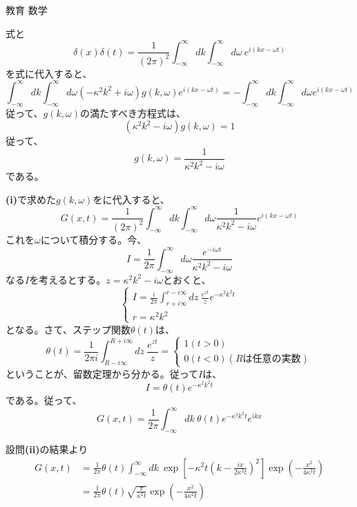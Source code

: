 \documentclass[fleqn]{jbook}
\begin{document}
\begin{answer}{教育 数学}{}
\begin{subanswers}
\begin{subsubanswers}
      
\end{subsubanswers}

\SubAnswer
\begin{subsubanswers}
      \SubSubAnswer
      式と
      \[
      \delta (x)\delta (t) = \frac{1}{(2 \pi)^2}\int^{\infty}_{-\infty}dk\int^{\infty}_{-\infty}d\omega \ e^{i(kx-\omega t)}
      \]
      を式に代入すると、
      \[
      \int^{\infty}_{-\infty}dk\int^{\infty}_{-\infty}d\omega (-\kappa^2 k^2 + i\omega) g(k,\omega)e^{i(kx-\omega t)} = - \int^{\infty}_{-\infty}dk\int^{\infty}_{-\infty}d\omega e^{i(kx-\omega t)}
      \]
      従って、$g(k,\omega)$の満たすべき方程式は、
      \[
      (\kappa^2 k^2 - i\omega) g(k,\omega) = 1
      \]
      従って、
      \[
       g(k,\omega) = \frac{1}{\kappa^2 k^2 - i\omega}
      \]
      である。
      
      
\SubSubAnswer
      
      \textbf{(i)}で求めた$g(k,\omega)$をに代入すると、
      \[
      G(x,t) = \frac{1}{(2 \pi)^2}\int^{\infty}_{-\infty}dk\int^{\infty}_{-\infty}d\omega \frac{1}{\kappa^2 k^2 - i\omega} e^{i(kx-\omega t)}
      \]
      これを$\omega$について積分する。今、
      \[
      I=\frac{1}{2 \pi}\int^{\infty}_{-\infty}d\omega \frac{e^{-i\omega t}}{\kappa^2 k^2 - i\omega}
      \]
      なる$I$を考えるとする。$z=\kappa^2 k^2 - i\omega$とおくと、
      \[
      \begin{cases}
         \displaystyle I = \frac{i}{2 \pi} \int^{r-i\infty}_{r+i\infty}\!dz\ \frac{e^{zt}}{z}e^{-\kappa^2 k^2 t} \\
         r = \kappa^2 k^2
      \end{cases}
      \]
      となる。さて、ステップ関数$\theta (t)$は、
      \[
      \theta (t) = \frac{1}{2\pi i}\int^{R+i\infty}_{R-i\infty}\!dz\ \frac{e^{zt}}{z}=
      \begin{cases}
       1　(t>0) \\
       0　(t<0)　　　(Rは任意の実数)
       \end{cases}
      \]
      ということが、留数定理から分かる。従って$I$は、
      \[
      I = \theta (t) e^{-\kappa^2 k^2 t}
      \]
      である。従って、
      \[
      G(x,t) = \frac{1}{2\pi}\int^{\infty}_{-\infty}\!dk\ \theta (t)e^{-\kappa^2 k^2 t}e^{ikx}
      \]
      
\SubSubAnswer
      設問\textbf{(ii)}の結果より
\begin{align*}
      G(x,t) &= \frac{1}{2\pi} \theta (t) \int^{\infty}_{-\infty}dk\ \exp\left[-\kappa^2 t\left(k-\frac{ix}{2\kappa^2 t}\right)^2\right] \exp\left(-\frac{x^2}{4\kappa^2 t}\right) \\
             &= \frac{1}{2\pi} \theta (t) \sqrt{\frac{\pi}{\kappa^2 t}} \exp\left(-\frac{x^2}{4\kappa^2 t}\right)
\end{align*}
      
\end{subsubanswers}
    
\end{subanswers}
\end{answer}
\end{document}
